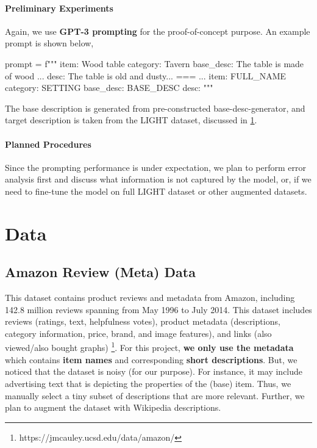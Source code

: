 \documentclass[12pt]{article}
\begin{document}
      \paragraph{Preliminary Experiments} Again, we use \textbf{GPT-3 prompting} for the proof-of-concept purpose. 
        An example prompt is shown below,
        \begin{python}
          
              prompt = f"""
              item: Wood table category: Tavern base_desc: The table is made of wood ... desc: The table is old and dusty... ===
                                  ...
              item: {FULL_NAME} category: {SETTING} base_desc: {BASE_DESC} desc:
              """
        \end{python}
        The base description is generated from pre-constructed base-desc-generator, and target description 
          is taken from the LIGHT dataset, discussed in \cref{section:data}.

      \paragraph{Planned Procedures} Since the prompting performance is under expectation, we plan to 
        perform error analysis first and discuss what information is not captured by the model, or, 
        if we need to fine-tune the model on full LIGHT dataset or other augmented datasets.

\section{Data}
\label{section:data}
  \subsection{Amazon Review (Meta) Data} 
    This dataset contains product reviews and metadata from Amazon, including 142.8 million reviews 
      spanning from May 1996 to July 2014. This dataset includes reviews (ratings, text, helpfulness votes), 
      product metadata (descriptions, category information, price, brand, and image features), and 
      links (also viewed/also bought graphs) \footnote{https://jmcauley.ucsd.edu/data/amazon/}. For this project, \textbf{we only use the metadata} which 
      contains \textbf{item names} and corresponding \textbf{short descriptions}. But, we noticed that 
      the dataset is noisy (for our purpose). For instance, it may include advertising 
      text that is depicting the properties of the (base) item. Thus, we manually select a tiny subset of 
      descriptions that are more relevant. Further, we plan to augment the dataset with Wikipedia descriptions.
\end{document}
